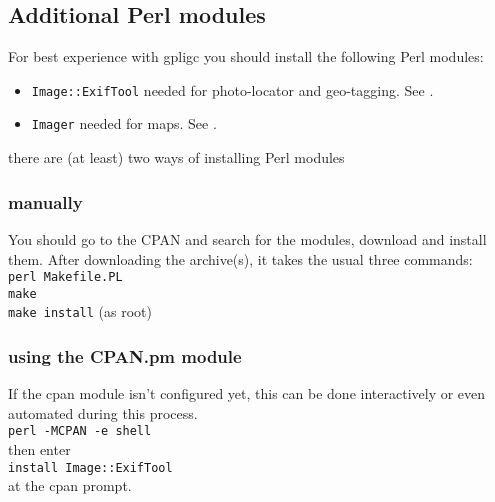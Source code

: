 %





\subsection{Additional Perl modules}
For best experience with gpligc you should install the following Perl modules:\\

\begin{itemize}
 \item \texttt{Image::ExifTool} \quad needed for photo-locator and geo-tagging. See \cite{exiftool}.
 \item \texttt{Imager} \quad needed for maps. See \cite{imager}.
\end{itemize}

there are (at least) two ways of installing Perl modules

\subsubsection{manually} You should go to the CPAN \cite{cpan} and search for the modules, download and install them.
 After downloading the archive(s), it takes the usual three commands: \\
\texttt{perl Makefile.PL} \\
\texttt{make} \\
\texttt{make install}   (as root)\\


\subsubsection{using the CPAN.pm module} If the cpan module isn't configured yet, this can be done interactively or even automated during this process. \\
\texttt{perl -MCPAN -e shell} \\
then enter \\
\texttt{install Image::ExifTool}\\
at the cpan prompt.
